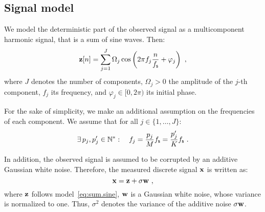 \subsection{Signal model}
We model the deterministic part of the observed signal as a multicomponent harmonic signal, that is a sum of sine waves. Then:
\begin{equation}
\bz[n]=\sum_{j=1}^J\Omega_j\cos\left(2\pi f_j \frac{n}{\fs} + \varphi_j\right)\ ,
\label{eq:sum.sine}
\end{equation}
where $J$ denotes the number of components, $\Omega_j>0$ the amplitude of the $j$-th component, $f_j$ its frequency, and $\varphi_j\in[0,2\pi)$ its initial phase.

\begin{remark}
For the sake of simplicity, we make an additional assumption on the frequencies of each component. We assume that for all $j\in\{1,\dots,J\}$:
\begin{equation}
\exists\, p_j,p_j'\in\mathbb N^*: \quad f_j = \dfrac{p_j}{M}f_{\mathsf s} = \dfrac{p'_j}{K}f_{\mathsf s}\ .
\end{equation}
\end{remark}

In addition, the observed signal is assumed to be corrupted by an additive Gaussian white noise. Therefore, the measured discrete signal ${\mathbf x}$ is written as:
\begin{equation}
\bx = \bz + \sigma\bw\ ,
\label{eq:model.noise}
\end{equation}
where ${\mathbf z}$ follows model~\eqref{eq:sum.sine}, ${\mathbf w}$ is a Gaussian white noise, whose variance is normalized to one. Thus, $\sigma^2$ denotes the variance of the additive noise $\sigma{\mathbf w}$.

